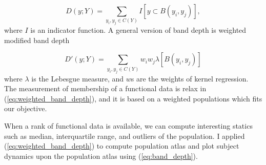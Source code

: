 \begin{equation}
D(y; Y) = \sum_{y_i, y_j \in C(Y)} I[y \subset B(y_i, y_j)],
\label{eq:band_depth}
\end{equation}
where $I$ is an indicator function.
A general version of band depth is weighted modified band depth

\begin{equation}
D'(y; Y) = \sum_{y_i, y_j \in C(Y)} w_iw_j\lambda[ B(y_i, y_j) ]
\label{eq:weighted_band_depth}
\end{equation}
where $\lambda$ is the Lebesgue measure, and $w$s are the weights of kernel regression.
The measurement of membership of a functional data is relax in 
(\ref{eq:weighted_band_depth}), and it is based on a weighted populations which fits our objective.

When a rank of functional data is available, we can compute interesting statics such as median, interquartile range, and outliers of the population.
I applied (\ref{eq:weighted_band_depth}) to compute population atlas and plot subject dynamics upon the population atlas using (\ref{eq:band_depth}).